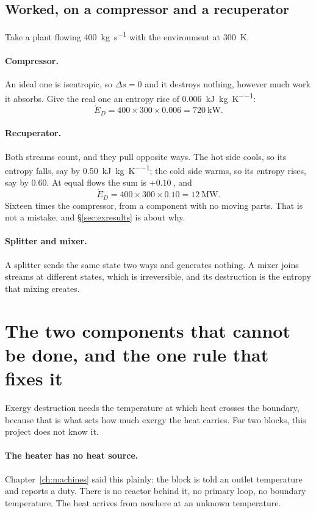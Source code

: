 \documentclass[11pt,a4paper]{report}
\begin{document}
\subsection{Worked, on a compressor and a recuperator}

Take a plant flowing \SI{400}{\kilogram\per\second} with the environment at
\SI{300}{\kelvin}.

\paragraph{Compressor.} An ideal one is isentropic, so
$\Delta s = 0$ and it destroys nothing, however much work it absorbs.
Give the real one an entropy rise of
\SI{0.006}{\kilo\joule\per\kilogram\per\kelvin}:
\[
  \dot E_D = 400 \times 300 \times 0.006 = \SI{720}{\kilo\watt}.
\]

\paragraph{Recuperator.} Both streams count, and they pull opposite ways.
The hot side cools, so its entropy falls, say by
\SI{0.50}{\kilo\joule\per\kilogram\per\kelvin}; the cold side warms, so its
entropy rises, say by \SI{0.60}{}. At equal flows the sum is
$+\SI{0.10}{}$, and
\[
  \dot E_D = 400 \times 300 \times 0.10 = \SI{12}{\mega\watt}.
\]
Sixteen times the compressor, from a component with no moving parts. That
is not a mistake, and \S\ref{sec:exresults} is about why.

\paragraph{Splitter and mixer.} A splitter sends the same state two ways and
generates nothing. A mixer joins streams at different states, which is
irreversible, and its destruction is the entropy that mixing creates.

\label{sec:nosource}
\section{The two components that cannot be done, and the one rule that fixes it}

Exergy destruction needs the temperature at which heat crosses the boundary,
because that is what sets how much exergy the heat carries. For two blocks,
this project does not know it.

\paragraph{The heater has no heat source.} Chapter~\ref{ch:machines} said
this plainly: the block is told an outlet temperature and reports a duty.
There is no reactor behind it, no primary loop, no boundary temperature.
The heat arrives from nowhere at an unknown temperature.
\end{document}
